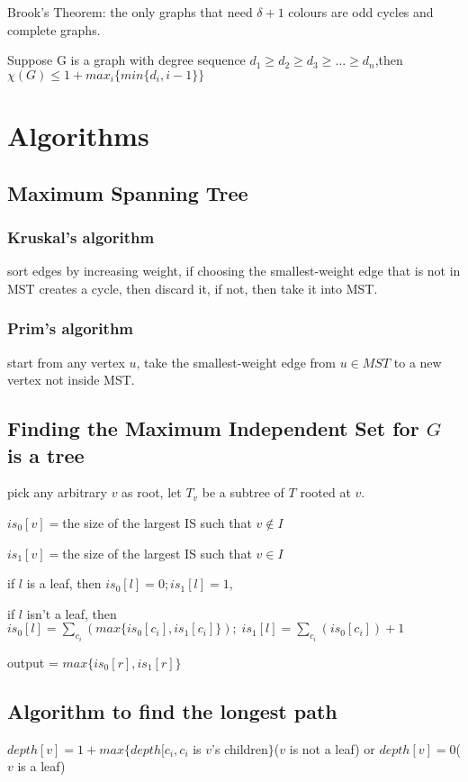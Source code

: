 \documentclass[12pt,a4paper]{ctexrep}
\begin{document}
Brook's Theorem: the only graphs that need $\delta +1$ colours are odd cycles and complete graphs.\

Suppose G is a graph with degree sequence $d_{1}\geq d_{2} \geq d_{3} \geq \dots \geq d_{n}$,then $\chi(G) \leq 1+max_{i}\{min\{d_{i},i-1\}\}$
\section{Algorithms}
\subsection{Maximum Spanning Tree}
\subsubsection{Kruskal's algorithm}
sort edges by increasing weight, if choosing the smallest-weight edge that is not in MST creates a cycle, then discard it, if not, then take it into MST.
\subsubsection{Prim's algorithm}
start from any vertex $u$, take the smallest-weight edge from $u \in MST$ to a new vertex not inside MST.

\subsection{Finding the Maximum Independent Set for $G$ is a tree}
pick any arbitrary $v$ as root, let $T_{v}$ be a subtree of $T$ rooted at $v$.

$is_{0}[v] = $the size of the largest IS such that $v \notin I$

$is_{1}[v] = $the size of the largest IS such that $v \in I$

if $l$ is a leaf, then $is_{0}[l] = 0;is_{1}[l] = 1$,

if $l$ isn't a leaf, then $is_{0}[l] = \sum_{c_{i}}(max\{is_{0}[c_{i}], is_{1}[c_{i}]\});\; is_{1}[l] = \sum_{c_{i}}(is_{0}[c_{i}])+1$

output = $max\{is_{0}[r],is_{1}[r]\}$

\subsection{Algorithm to find the longest path}
$depth[v] = 1+max\{depth[c_{i},c_{i}$ is $v$'s children$\}$($v$ is not a leaf) or $depth[v] = 0$($v$ is a leaf)
\end{document}
